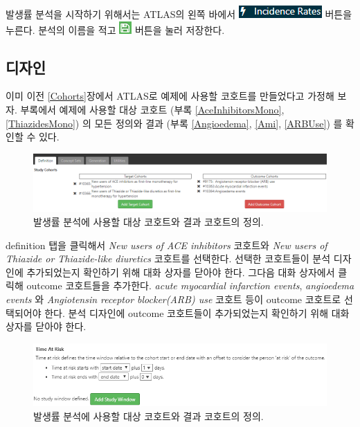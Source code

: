 \documentclass[11pt]{book}
\theoremstyle{definition}
\theoremstyle{definition}
\theoremstyle{definition}
\theoremstyle{remark}
\begin{document}
발생률 분석을 시작하기 위해서는 ATLAS의 왼쪽 바에서
\includegraphics{images/Characterization/atlasIncidenceMenuItem.png}
버튼을 누른다. 분석의 이름을 적고
\includegraphics{images/PopulationLevelEstimation/save.png} 버튼을 눌러
저장한다.

\subsection{디자인}\label{-1}

이미 이전 \ref{Cohorts}장에서 ATLAS로 예제에 사용할 코호트를 만들었다고
가정해 보자. 부록에서 예제에 사용할 대상 코호트 (부록
\ref{AceInhibitorsMono}, \ref{ThiazidesMono}) 의 모든 정의와 결과 (부록
\ref{Angioedema}, \ref{Ami}, \ref{ARBUse}) 를 확인할 수 있다.

\begin{figure}

{\centering \includegraphics[width=1\linewidth]{images/Characterization/atlasIncidenceCohortSelection} 

}

\caption{발생률 분석에 사용할 대상 코호트와 결과 코호트의 정의.}\label{fig:atlasIncidenceCohortSelection}
\end{figure}

definition 탭을 클릭해서 \emph{New users of ACE inhibitors} 코호트와
\emph{New users of Thiazide or Thiazide-like diuretics} 코호트를
선택한다. 선택한 코호트들이 분석 디자인에 추가되었는지 확인하기 위해
대화 상자를 닫아야 한다. 그다음 대화 상자에서 클릭해 outcome 코호트들을
추가한다. \emph{acute myocardial infarction events}, \emph{angioedema
events} 와 \emph{Angiotensin receptor blocker(ARB) use} 코호트 등이
outcome 코호트로 선택되어야 한다. 분석 디자인에 outcome 코호트들이
추가되었는지 확인하기 위해 대화 상자를 닫아야 한다.

\begin{figure}

{\centering \includegraphics[width=1\linewidth]{images/Characterization/atlasIncidenceTimeAtRisk} 

}

\caption{발생률 분석에 사용할 대상 코호트와 결과 코호트의 정의.}\label{fig:atlasIncidenceTimeAtRisk}
\end{figure}
\end{document}
